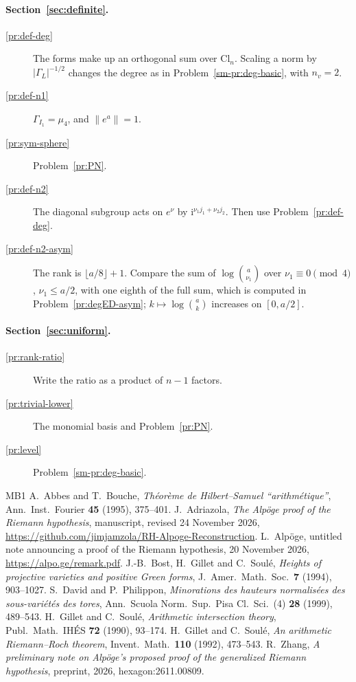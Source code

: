 \documentclass[reqno]{amsart}
\theoremstyle{definition}
\theoremstyle{plain}
\newcommand{\ii}{\mathrm{i}}
\newcommand{\Cl}{\mathrm{Cl}}
\begin{document}
\paragraph{Section~\ref{sec:definite}.}
\begin{description}
\item[\ref{pr:def-deg}] The forms make up an orthogonal sum over \(\Cl_n\).  Scaling a norm by \(\lvert\Gamma_L\rvert^{-1/2}\) changes the degree as in Problem~\ref{sm-pr:deg-basic}, with \(n_v = 2\).
\item[\ref{pr:def-n1}] \(\Gamma_{I_1} = \mu_4\), and \(\lVert e^a \rVert = 1\).
\item[\ref{pr:sym-sphere}] Problem~\ref{pr:PN}.
\item[\ref{pr:def-n2}] The diagonal subgroup acts on \(e^\nu\) by \(\ii^{\nu_1 j_1 + \nu_2 j_2}\).  Then use Problem~\ref{pr:def-deg}.
\item[\ref{pr:def-n2-asym}] The rank is \(\lfloor a/8 \rfloor + 1\).  Compare the sum of \(\log\binom{a}{\nu_1}\) over \(\nu_1 \equiv 0 \pmod 4\), \(\nu_1 \le a/2\), with one eighth of the full sum, which is computed in Problem~\ref{pr:degED-asym}; \(k \mapsto \log\binom{a}{k}\) increases on \([0, a/2]\).
\end{description}
\paragraph{Section~\ref{sec:uniform}.}
\begin{description}
\item[\ref{pr:rank-ratio}] Write the ratio as a product of \(n - 1\) factors.
\item[\ref{pr:trivial-lower}] The monomial basis and Problem~\ref{pr:PN}.
\item[\ref{pr:level}] Problem~\ref{sm-pr:deg-basic}.
\end{description}

\begin{thebibliography}{MB1}
 A.~Abbes and T.~Bouche, \emph{Th\'eor\`eme de Hilbert--Samuel ``arithm\'etique''}, Ann.\ Inst.\ Fourier \textbf{45} (1995), 375--401.
 J.~Adriazola, \emph{The Alp\"oge proof of the Riemann hypothesis}, manuscript, revised 24 November 2026, \url{https://github.com/jimjamzola/RH-Alpoge-Reconstruction}.
 L.~Alp\"oge, untitled note announcing a proof of the Riemann hypothesis, 20 November 2026, \url{https://alpo.ge/remark.pdf}.
 J.-B.~Bost, H.~Gillet and C.~Soul\'e, \emph{Heights of projective varieties and positive Green forms}, J.\ Amer.\ Math.\ Soc.\ \textbf{7} (1994), 903--1027.
 S.~David and P.~Philippon, \emph{Minorations des hauteurs normalis\'ees des sous-vari\'et\'es des tores}, Ann.\ Scuola Norm.\ Sup.\ Pisa Cl.\ Sci.\ (4) \textbf{28} (1999), 489--543.
 H.~Gillet and C.~Soul\'e, \emph{Arithmetic intersection theory}, Publ.\ Math.\ IH\'ES \textbf{72} (1990), 93--174.
 H.~Gillet and C.~Soul\'e, \emph{An arithmetic Riemann--Roch theorem}, Invent.\ Math.\ \textbf{110} (1992), 473--543.
 R.~Zhang, \emph{A preliminary note on Alp\"oge's proposed proof of the generalized Riemann hypothesis}, preprint, 2026, hexagon:2611.00809.
\end{thebibliography}
\end{document}
